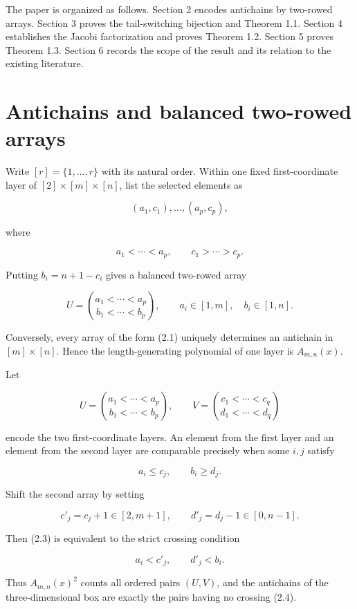 \documentclass[11pt]{article}
\numberwithin{equation}{section}
\begin{document}
The paper is organized as follows. Section 2 encodes antichains by two-rowed
arrays. Section 3 proves the tail-switching bijection and Theorem 1.1. Section 4
establishes the Jacobi factorization and proves Theorem 1.2. Section 5 proves
Theorem 1.3. Section 6 records the scope of the result and its relation to the
existing literature.

\section{Antichains and balanced two-rowed arrays}


Write $[r]=\{1,\ldots,r\}$ with its natural order. Within one fixed first-coordinate
layer of $[2]\times[m]\times[n]$, list the selected elements as

\nopagebreak[4]
\[
(a_1,c_1),\ldots,(a_p,c_p),
\]

where

\nopagebreak[4]
\[
a_1<\cdots<a_p,
\qquad
c_1>\cdots>c_p.
\]

Putting $b_i=n+1-c_i$ gives a balanced two-rowed array

\nopagebreak[4]
\[
U=\binom{a_1<\cdots<a_p}{b_1<\cdots<b_p},
\qquad
a_i\in[1,m],\quad b_i\in[1,n].
\tag{2.1}
\]

Conversely, every array of the form (2.1) uniquely determines an antichain in
$[m]\times[n]$. Hence the length-generating polynomial of one layer is
$A_{m,n}(x)$.

Let

\nopagebreak[4]
\[
U=\binom{a_1<\cdots<a_p}{b_1<\cdots<b_p},
\qquad
V=\binom{c_1<\cdots<c_q}{d_1<\cdots<d_q}
\tag{2.2}
\]

encode the two first-coordinate layers. An element from the first layer and an
element from the second layer are comparable precisely when some $i,j$ satisfy

\nopagebreak[4]
\[
a_i\leq c_j,
\qquad
b_i\geq d_j.
\tag{2.3}
\]

Shift the second array by setting

\nopagebreak[4]
\[
c'_j=c_j+1\in[2,m+1],
\qquad
d'_j=d_j-1\in[0,n-1].
\]

Then (2.3) is equivalent to the strict crossing condition

\nopagebreak[4]
\[
a_i<c'_j,
\qquad
d'_j<b_i.
\tag{2.4}
\]

Thus $A_{m,n}(x)^2$ counts all ordered pairs $(U,V)$, and the antichains of the
three-dimensional box are exactly the pairs having no crossing (2.4).
\end{document}

